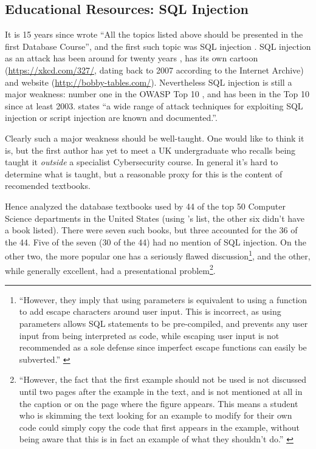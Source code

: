 \documentclass[sigconf,anonymous]{acmart}
\begin{document}


\subsection{Educational Resources: SQL Injection}\label{sec:SQL}
It is 15 years since \cite{Guimaraesetal2004} 
wrote ``All the topics listed above should be presented in the first
Database Course'', and the first such topic was SQL injection \cite{SPIDynamics2002,Anonymous2018b}. SQL injection as an attack has been around for twenty years \cite{HornerHyslip2017a}, has its own cartoon (\url{https://xkcd.com/327/}, dating back to 2007 according to the Internet Archive) and website (\url{http://bobby-tables.com/}). Nevertheless SQL injection is still a major weakness: number one in the OWASP Top 10 \cite{OWASP2017a}, and has been in the Top 10 since at least 2003.  \cite[the UK's definitive reference]{Bristol2018a} states ``a wide range of attack techniques for exploiting SQL
injection or script injection are known and documented.''.

Clearly such a major weakness should be well-taught. One would like to think it is, but the first author has yet to meet a UK undergraduate who recalls being taught it \emph{outside} a specialist Cybersecurity course.  In general it's hard to determine what is taught, but a reasonable proxy for this is the content of recomended textbooks. 

Hence \cite{Drop2019} analyzed the database textbooks used by  44 of the top 50 Computer Science
departments in the United States (using \cite{StangerMartin2015a}'s list, the other six didn't have a book listed). There were seven such books, but three accounted for the 36 of the 44. Five of the seven (30 of the 44) had no mention of SQL injection. On the other two, the more popular one has a seriously flawed discussion\footnote{``However, they imply that using parameters is equivalent to using a function to add escape characters
around user input. This is incorrect, as using parameters allows
SQL statements to be pre-compiled, and prevents any user input
from being interpreted as code, while escaping user input is not
recommended as a sole defense since imperfect escape functions
can easily be subverted.'' \cite{Drop2019}}, and the other, while generally excellent, had a presentational problem\footnote{``However, the fact that the first
example should not be used is not discussed until two pages after
the example in the text, and is not mentioned at all in the caption or
on the page where the figure appears. This means a student who is
skimming the text looking for an example to modify for their own
code could simply copy the code that first appears in the example,
without being aware that this is in fact an example of what they
shouldn't do.'' \cite{Drop2019}}.
\end{document}
